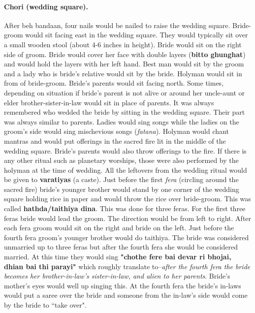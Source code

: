 \paragraph{Chori (wedding square).} After beh bandaan, four nails would be
nailed to raise the wedding square. Bride-groom would sit facing east in the
wedding square. They would typically sit over a small wooden stool (about 4-6
inches in height). Bride would sit on the right side of groom. Bride
would cover her face with double layers (\textbf{bitto ghunghat}) and would
hold the layers with her left hand. Best man would sit by the groom and a lady
who is bride's relative would sit by the bride. Holyman would sit in from of
bride-groom. Bride's parents would sit facing north. Some times, depending on
situation if bride's parent is not alive or around her uncle-aunt or elder
brother-sister-in-law would sit in place of parents. It was always remembered
who wedded the bride by sitting in the wedding square. Their part was always
similar to parents. Ladies would sing songs while the ladies on the groom's
side would sing mischevious songs (\textit{fatana}). Holyman would chant
mantras and would put offerings in the sacred fire lit in the middle of the
wedding square. Bride's parents would also throw offerings to the fire. If
there is any other ritual such as planetary worships, those were also performed
by the holyman at the time of wedding. All the leftovers from the wedding
ritual would be given to \textbf{varatiyas} (a caste). Just before the first
\textit{fera} (circling around the sacred fire) bride's younger brother would
stand by one corner of the wedding square holding rice in paper and would throw
the rice over bride-groom. This was called \textbf{hathda/taithiya dina}. This
was done for three feras. For the first three feras bride would lead the groom.
The direction would be from left to right. After each fera groom would sit on
the right and bride on the left. Just before the fourth fera groom's younger
brother would do taithiya. The bride was considered unmarried up to three feras
but after the fourth fera she would be considered married. At this time they
would sing \textbf{"chothe fere bai devar ri bhojai, dhian bai thi parayi"}
which roughly translate to--\textit{after the fourth fera the bride becomes her
brother-in-law's sister-in-law, and alien to her parents}. Bride's mother's
eyes would well up singing this. At the fourth fera the bride's in-laws
would put a saree over the bride and someone from the in-law's side would
come by the bride to ``take over".

